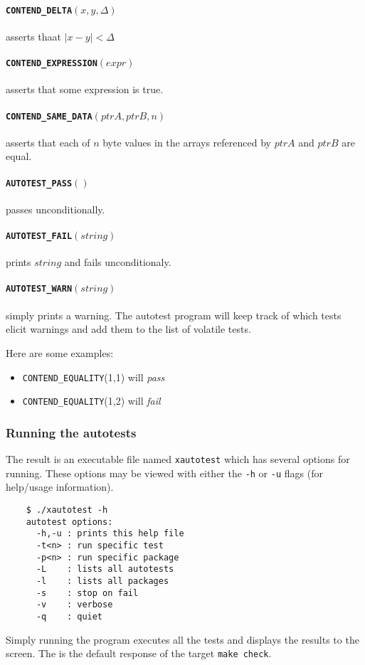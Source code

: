 \documentclass[11pt,twoside]{report}
\begin{document}
\paragraph{{\tt CONTEND\_DELTA}$(x,y,\Delta)$} asserts thaat $|x-y|<\Delta$
\paragraph{{\tt CONTEND\_EXPRESSION}$(expr)$} asserts that some expression is
true.
\paragraph{{\tt CONTEND\_SAME\_DATA}$(ptrA,ptrB,n)$} asserts that each of $n$
byte values in the arrays referenced by $ptrA$ and $ptrB$ are equal.
\paragraph{{\tt AUTOTEST\_PASS}$()$} passes unconditionally.
\paragraph{{\tt AUTOTEST\_FAIL}$(string)$} prints $string$ and fails
unconditionaly.
\paragraph{{\tt AUTOTEST\_WARN}$(string)$} simply prints a warning.
The autotest program will keep track of which tests elicit warnings and add
them to the list of volatile tests.

Here are some examples:
\begin{itemize}
\item[] {\tt CONTEND\_EQUALITY}(1,1) will {\it pass}
\item[] {\tt CONTEND\_EQUALITY}(1,2) will {\it fail}
\end{itemize}

\subsubsection{Running the autotests}
The result is an executable file named {\tt xautotest} which has several
options for running.
These options may be viewed with either the {\tt -h} or {\tt -u} flags (for
help/usage information).
\begin{verbatim}
    $ ./xautotest -h
    autotest options:
      -h,-u : prints this help file
      -t<n> : run specific test
      -p<n> : run specific package
      -L    : lists all autotests
      -l    : lists all packages
      -s    : stop on fail
      -v    : verbose
      -q    : quiet
\end{verbatim}
Simply running the program executes all the tests and displays the results to
the screen.
The is the default response of the target {\tt make check}.
\end{document}
